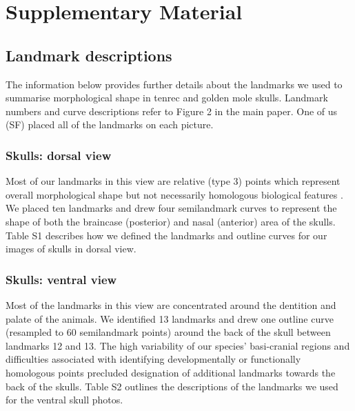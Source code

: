 \documentclass[12pt,a4paper]{article}
\newcommand{\beginsupplement}{%
	       \setcounter{table}{0}
	        \renewcommand{\thetable}{S\arabic{table}}%
	        \setcounter{figure}{0}
	        \renewcommand{\thefigure}{S\arabic{figure}}%
	     }
\begin{document}
\beginsupplement

{\centering\section{Supplementary Material}}

\subsection{Landmark descriptions}
\vspace*{-0.5cm}
	The information below provides further details about the landmarks we used to summarise morphological shape in tenrec and golden mole skulls. Landmark numbers and curve descriptions refer to Figure 2 in the main paper. One of us (SF) placed all of the landmarks on each picture.

\subsubsection{Skulls: dorsal view}
\vspace*{-0.5cm}
	Most of our landmarks in this view are relative (type 3) points which represent overall morphological shape but not necessarily homologous biological features \citep{Zelditch2012}. We placed ten landmarks and drew four semilandmark curves to represent the shape of both the braincase (posterior) and nasal (anterior) area of the skulls. Table S1 describes how we defined the landmarks and outline curves for our images of skulls in dorsal view.

\subsubsection{Skulls: ventral view}
\vspace*{-0.5cm}
	Most of the landmarks in this view are concentrated around the dentition and palate of the animals. We identified 13 landmarks and drew one outline curve (resampled to 60 semilandmark points) around the back of the skull between landmarks 12 and 13. The high variability of our species' basi-cranial regions and difficulties associated with identifying developmentally or functionally homologous points precluded designation of additional landmarks towards the back of the skulls. Table S2 outlines the descriptions of the landmarks we used for the ventral skull photos.
	
\newpage
\end{document}
